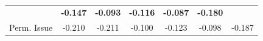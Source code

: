 \begin{table}
\begin{tabular}{|c|cccccc|}
    & \hspace{-4pt} \textbf{-0.147} \hspace{-5pt}
    & \hspace{-4pt} \textbf{-0.093} \hspace{-5pt}
    & \hspace{-4pt} \textbf{-0.116} \hspace{-5pt}
    & \hspace{-4pt} \textbf{-0.087} \hspace{-5pt}
    & \hspace{-4pt} \textbf{-0.180} \hspace{-4pt} \\
    \hspace{-5pt} Perm. Issue \hspace{-5pt}
    & \hspace{-4pt} -0.210 \hspace{-5pt}
    & \hspace{-4pt} -0.211 \hspace{-5pt}
    & \hspace{-4pt} -0.100 \hspace{-5pt}
    & \hspace{-4pt} -0.123 \hspace{-5pt}
    & \hspace{-4pt} -0.098 \hspace{-5pt}
    & \hspace{-4pt} -0.187 \hspace{-4pt} \\
    \hline
  \end{tabular}
  \normalsize
  \label{table:performance_comparison}
\end{table}

